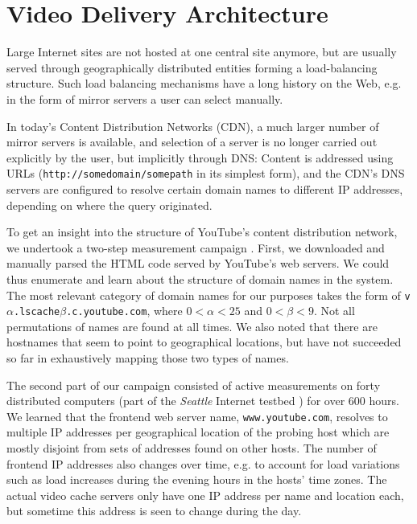 \section{Video Delivery Architecture}
\label{sec:videodeliveryarchitecture}


Large Internet sites are not hosted at one central site anymore, but are usually served through geographically distributed entities forming a load-balancing structure. Such load balancing mechanisms have a long history on the Web, e.g. in the form of mirror servers a user can select manually.

In today's Content Distribution Networks (CDN), a much larger number of mirror servers is available, and selection of a server is no longer carried out explicitly by the user, but implicitly through DNS: Content is addressed using URLs (\texttt{http://somedomain/somepath} in its simplest form), and the CDN's DNS servers are configured to resolve certain domain names to different IP addresses, depending on where the query originated.

To get an insight into the structure of YouTube's content distribution network, we undertook a two-step measurement campaign \cite{rafetseder2011explyt}. First, we downloaded and manually parsed the HTML code served by YouTube's web servers. We could thus enumerate and learn about the structure of domain names in the system. The most relevant category of domain names for our purposes takes the form of \texttt{v$\alpha$.lscache$\beta$.c.youtube.com}, where $0<\alpha<25$ and $0<\beta<9$. Not all permutations of names are found at all times. We also noted that there are hostnames that seem to point to geographical locations, but have not succeeded so far in exhaustively mapping those two types of names.

The second part of our campaign consisted of active measurements on forty distributed computers (part of the \textit{Seattle} Internet testbed \cite{Cappos:2009:SPE:1508865.1508905, seattlewww}) for over 600 hours. We learned that the frontend web server name, \texttt{www.youtube.com}, resolves to multiple IP addresses per geographical location of the probing host which are mostly disjoint from sets of addresses found on other hosts. The number of frontend IP addresses also changes over time, e.g. to account for load variations such as load increases during the evening hours in the hosts' time zones. The actual video cache servers only have one IP address per name and location each, but sometime this address is seen to change during the day. 

